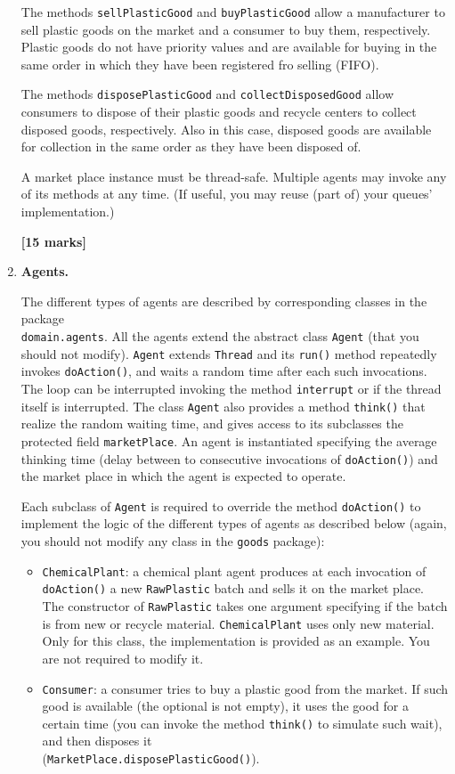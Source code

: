 \documentclass[a4wide,11pt]{article}
\renewcommand{\j}[1]{\texttt{#1}}
\begin{document}
\begin{enumerate}
The methods \j{sellPlasticGood} and \j{buyPlasticGood} allow a manufacturer to
sell plastic goods on the market and a consumer to buy them, respectively.
Plastic goods do not have priority values and are available for buying in the
same order in which they have been registered fro selling (FIFO).

 The methods
\j{disposePlasticGood} and \j{collectDisposedGood} allow consumers to dispose
of their plastic goods and recycle centers to collect disposed goods,
respectively. Also in this case, disposed goods are available for collection in
the same order as they have been disposed of.

A market place instance must be thread-safe. Multiple agents may invoke any of
its
methods at any time. (If useful, you may reuse (part of) your queues'
implementation.)

\textbf{[15 marks]}

\clearpage

\item \textbf{Agents.}

The different types of agents are described by corresponding classes in the
package \\\j{domain.agents}. All the agents extend the abstract class \j{Agent}
(that you should not modify). \j{Agent} extends \j{Thread} and its \j{run()}
method repeatedly invokes \j{doAction()}, and waits a random time after
each such invocations. The loop can be interrupted invoking the method
\j{interrupt} or if the thread itself is interrupted. The class \j{Agent} also
provides a method \j{think()} that realize the random waiting time, and gives
access to its subclasses the protected field \j{marketPlace}. 
An agent is instantiated specifying the average thinking time (delay between to
consecutive invocations of \j{doAction()}) and the market place in which the
agent is expected to operate.

Each subclass of \j{Agent} is required to override the method \j{doAction()} to
implement the logic of the different types of agents as described below
(again, you should not modify any class in the \j{goods} package):

\begin{itemize}
	\item \j{ChemicalPlant}: a chemical plant agent produces at each invocation of
\j{doAction()} a new \j{RawPlastic} batch and sells it on the market place.
The constructor of \j{RawPlastic} takes one argument specifying if the batch is
from new or recycle material. \j{ChemicalPlant} uses only new material. Only
for this class, the implementation is provided as an example. You are not
required to modify it.
	\item \j{Consumer}: a consumer tries to buy a plastic good from the market. If
such good is available (the optional is not empty), it uses the good for a
certain time (you can invoke the method \j{think()} to simulate such wait), and
then disposes it \\ (\j{MarketPlace.disposePlasticGood()}). 


\end{itemize}
\end{enumerate}
\end{document}

